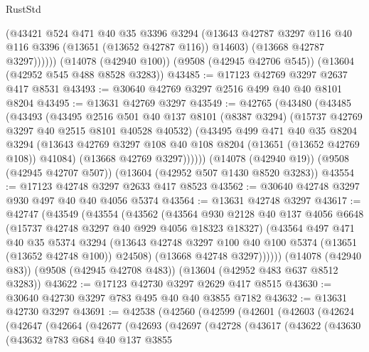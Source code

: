 \begin{lexlean}{RustStd}
\begin{coremodule}
            (@43421
              @524
              @471
              @40
              @35
              @3396
              @3294
              (@13643 @42787 @3297 @116 @40 @116 @3396 (@13651 (@13652 @42787 @116)) @14603)
              (@13668 @42787 @3297))))))
    (@14078 (@42940 @100))
    (@9508 (@42945 @42706 @545))
    (@13604 (@42952 @545 @488 @8528 @3283))
@43485 := @17123 @42769 @3297 @2637 @417 @8531
@43493 := @30640 @42769 @3297 @2516 @499 @40 @40 @8101 @8204
@43495 := @13631 @42769 @3297
@43549 := @42765
    (@43480
      (@43485
        (@43493
          (@43495
            @2516
            @501
            @40
            @137
            @8101
            (@8387 @3294)
            (@15737 @42769 @3297 @40 @2515 @8101 @40528 @40532)
            (@43495
              @499
              @471
              @40
              @35
              @8204
              @3294
              (@13643 @42769 @3297 @108 @40 @108 @8204 (@13651 (@13652 @42769 @108)) @41084)
              (@13668 @42769 @3297))))))
    (@14078 (@42940 @19))
    (@9508 (@42945 @42707 @507))
    (@13604 (@42952 @507 @1430 @8520 @3283))
@43554 := @17123 @42748 @3297 @2633 @417 @8523
@43562 := @30640 @42748 @3297 @930 @497 @40 @40 @4056 @5374
@43564 := @13631 @42748 @3297
@43617 := @42747
    (@43549
      (@43554
        (@43562
          (@43564
            @930
            @2128
            @40
            @137
            @4056
            @6648
            (@15737 @42748 @3297 @40 @929 @4056 @18323 @18327)
            (@43564
              @497
              @471
              @40
              @35
              @5374
              @3294
              (@13643 @42748 @3297 @100 @40 @100 @5374 (@13651 (@13652 @42748 @100)) @24508)
              (@13668 @42748 @3297))))))
    (@14078 (@42940 @83))
    (@9508 (@42945 @42708 @483))
    (@13604 (@42952 @483 @637 @8512 @3283))
@43622 := @17123 @42730 @3297 @2629 @417 @8515
@43630 := @30640 @42730 @3297 @783 @495 @40 @40 @3855 @7182
@43632 := @13631 @42730 @3297
@43691 := @42538
    (@42560
      (@42599
        (@42601
          (@42603
            (@42624
              (@42647
                (@42664
                  (@42677
                    (@42693
                      (@42697
                        (@42728
                          (@43617
                            (@43622
                              (@43630
                                (@43632
                                  @783
                                  @684
                                  @40
                                  @137
                                  @3855

\end{coremodule}
\end{lexlean}
